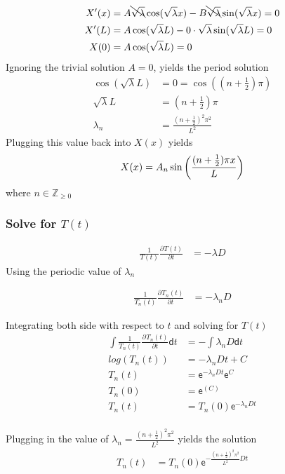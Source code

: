 \documentclass[a4paper]{article}
\newcommand*{\pd}[3][]{\ensuremath{\frac{\partial^{#1} #2}{\partial #3}}}
\begin{document}
\begin{align*}
X'(x) &= A \bcancel{\sqrt{\lambda}} \cos(\sqrt{\lambda}x) - B \bcancel{\sqrt{\lambda}} \sin(\sqrt{\lambda}x) = 0\\
X'(L) &= A \cos(\sqrt{\lambda}L) - 0 \cdot \sqrt{\lambda} \sin(\sqrt{\lambda}L) = 0\\
X(0) &= A \cos(\sqrt{\lambda}L) = 0 \\
\end{align*}
Ignoring the trivial solution $A = 0$, yields the period solution 
\begin{align*}
\cos(\sqrt{\lambda}L) &= 0 = \cos((n+\frac{1}{2})\pi) \\
\sqrt{\lambda}L &= (n+\frac{1}{2})\pi  \\
\lambda_{n} &= \frac{(n+\frac{1}{2})^{2}\pi^{2}}{L^{2}}
\end{align*} 
Plugging this value back into $X(x)$ yields
\begin{equation}
 X(x) = A_{n} \sin \bigg(\frac{(n+\frac{1}{2}) \pi x}{L} \bigg)     \\
\end{equation}
where $ n \in \mathbb Z_{\ge 0}$ 

\subsubsection{Solve for $T(t)$}

\begin{align}
\frac{1}{T(t)}\pd{T(t)}{t} &= -\lambda D 
\end{align}
Using the periodic value of $\lambda_{n}$

\begin{align}
\frac{1}{T_{n}(t)}\pd{T_{n}(t)}{t} &= -\lambda_{n} D 
\end{align}

Integrating both side with respect to $t$ and solving for $T(t)$
\begin{align*}
\int \frac{1}{T_{n}(t)}\pd{T_{n}(t)}{t} \mathsf{d}t &= -\int \lambda_{n} D \mathsf{d}t \\
log(T_{n}(t)) &= - \lambda_{n} D t + C \\
T_{n}(t) &= \mathsf{e}^{-\lambda_{n} D t}\mathsf{e}^{C}  \\
T_{n}(0) &= \mathsf{e}^(C)  \\
T_{n}(t) &= T_{n}(0)\mathsf{e}^{-\lambda_{n} D t} \\
\end{align*}

Plugging in the value of $\lambda_{n} = \frac{(n+\frac{1}{2})^{2}\pi^{2}}{L^{2}}$ yields the solution
\begin{align}
T_{n}(t) &= T_{n}(0)\mathsf{e}^{-\frac{(n+\frac{1}{2})^{2}\pi^{2}}{L^{2}} D t} 
\end{align}
\end{document}
